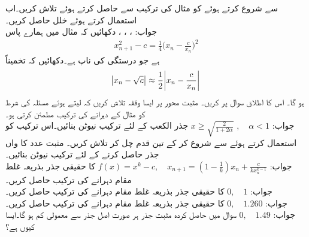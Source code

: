 \quad
{} سے شروع کرتے ہوئے  کو مثال  کی ترکیب سے حاصل کرتے ہوئے  تلاش کریں۔اب  استعمال کرتے ہوئے خلل حاصل کریں۔\\
جواب:\quad
{}، ، ،
\quad
دکھائیں کہ مثال  میں ہمارے پاس
\begin{align*}
x^2_{n+1}-c=\frac{1}{4}\big(x_n-\frac{c}{x_n}\big)^2
\end{align*}
ہے جو درستگی کی ناپ ہے۔دکھائیں کہ تخمیناً
\begin{align*}
\abs{x_n-\sqrt{c}}\approx \frac{1}{2}\abs{x_n-\frac{c}{x_n}}
\end{align*}
ہو گا۔ اس کا اطلاق سوال  پر کریں۔
\quad
مثبت  محور پر ایسا وقفہ تلاش کریں کہ  لیتے ہوئے مسئلہ  کی شرط کو  مثال  کے دہرانے کی ترکیب مطمئن کرتی ہو۔ \\
جواب:\quad
$x\ge \sqrt{\tfrac{2}{1+2\alpha}}\,\,,\quad \alpha<1$
\quad
جذر الکعب کے لئے ترکیب نیوٹن بنائیں۔اس ترکیب کو استعمال کرتے ہوئے  سے شروع کر کے تین قدم چل کر   تلاش کریں۔
\quad
مثبت عدد  کا  واں جذر حاصل کرنے کے لئے ترکیب نیوٹن بنائیں۔\\
جواب:\quad
$f(x)=x^k-c,\quad x_{n+1}=(1-\tfrac{1}{k})x_n+\tfrac{c}{kx_n^{k-1}}$
\quad
{} کا حقیقی جذر بذریعہ غلط مقام دہرانے کی ترکیب حاصل کریں۔ \\
جواب:\quad
$0,\quad 1$
\quad
{} کا حقیقی جذر بذریعہ غلط مقام دہرانے کی ترکیب حاصل کریں۔ \\
جواب:\quad
$0,\quad 1.260$
\quad
{} کا حقیقی جذر بذریعہ غلط مقام دہرانے کی ترکیب حاصل کریں۔ \\
جواب:\quad
$0,\quad 1.49$
\quad
سوال  میں حاصل کردہ مثبت جذر ہر صورت اصل جذر سے معمولی کم ہو گا۔ایسا کیوں ہے؟
